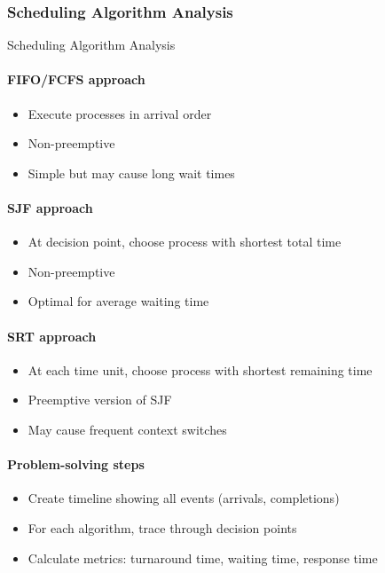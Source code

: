 \multend

\subsubsection{Scheduling Algorithm Analysis}


\begin{KR}{Scheduling Algorithm Analysis}
    \paragraph{FIFO/FCFS approach}
    \begin{itemize}
        \item Execute processes in arrival order
        \item Non-preemptive
        \item Simple but may cause long wait times
    \end{itemize}
    
    \paragraph{SJF approach}
    \begin{itemize}
        \item At decision point, choose process with shortest total time
        \item Non-preemptive
        \item Optimal for average waiting time
    \end{itemize}
    
    \paragraph{SRT approach}
    \begin{itemize}
        \item At each time unit, choose process with shortest remaining time
        \item Preemptive version of SJF
        \item May cause frequent context switches
    \end{itemize}
    
    \paragraph{Problem-solving steps}
    \begin{itemize}
        \item Create timeline showing all events (arrivals, completions)
        \item For each algorithm, trace through decision points
        \item Calculate metrics: turnaround time, waiting time, response time
    \end{itemize}
\end{KR}



